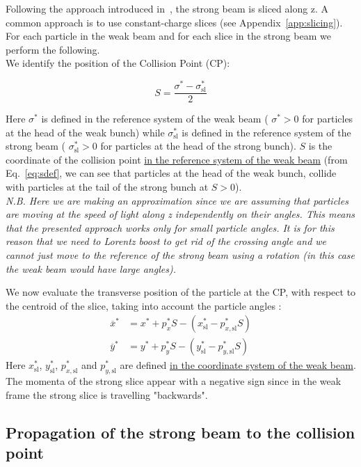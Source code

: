 Following the approach introduced in~\cite{hirata}, the strong beam is sliced along z. A common approach is to use constant-charge slices (see Appendix~\ref{app:slicing}). For each particle in the weak beam and for each slice in the strong beam we perform the following.
~\\

We identify the position of the Collision Point (CP):

\begin{equation}
S = \frac{\sigma^*-\sigma^*_\textrm{sl}}{2}
\label{eq:sdef}
\end{equation}

Here $\sigma^*$ is defined in the reference system of the weak beam ( $\sigma^*>0$ for particles at the head of the weak bunch) while $\sigma^*_\textrm{sl}$ is defined in the reference system of the strong beam ( $\sigma^*_\textrm{sl}>0$ for particles at the head of the strong bunch). $S$ is the coordinate of the collision point \underline{in the reference system of the weak beam} (from Eq.~\ref{eq:sdef}, we can see that particles at the head of the weak bunch, collide with particles at the tail of the strong bunch at $S>0$). 
~\\

\textit{N.B. Here we are making an approximation since we are assuming that particles are moving at the speed of light along z independently on their angles. This means that the presented approach works only for small particle angles. It is for this reason that we need to Lorentz boost to get rid of the crossing angle and we cannot just move to the reference of the strong beam using a rotation (in this case the weak beam would have large angles).}

We now evaluate the transverse position of the particle at the CP, with respect to the centroid of the slice, taking into account the particle angles :
\begin{align}
\overline{x}^* &= x^* + p^*_x S - (x^*_\textrm{sl} - p^*_{x, \textrm{sl}} S)\\
\overline{y}^* &= y^* + p^*_y S - (y^*_\textrm{sl} - p^*_{y, \textrm{sl}} S)
\end{align}
Here $x^*_\textrm{sl}$, $y^*_\textrm{sl}$, $p^*_{x, \textrm{sl}}$ and $p^*_{y, \textrm{sl}}$  are defined \underline{in the coordinate system of the weak beam}. The momenta of the strong slice appear with a negative sign since in the weak frame the strong slice is travelling "backwards".

\subsection{Propagation of the strong beam to the collision point}

